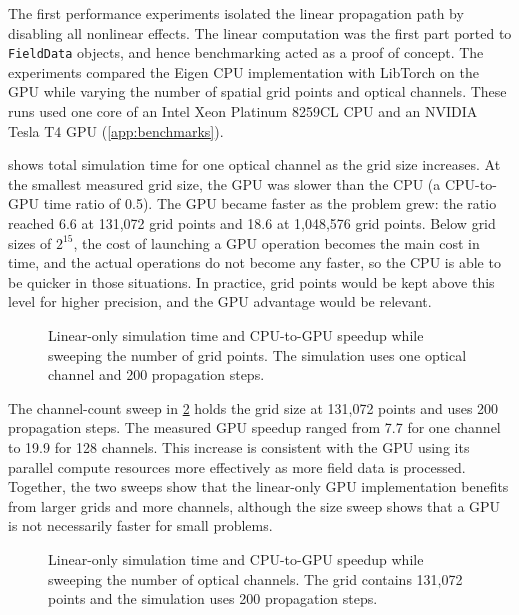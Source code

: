 The first performance experiments isolated the linear propagation path by disabling all
nonlinear effects. The linear computation was the first part ported to \texttt{FieldData}
objects, and hence benchmarking acted as a proof of concept. The experiments compared the
Eigen CPU implementation with LibTorch on the GPU while varying the number of spatial grid
points and optical channels. These runs used one core of an Intel Xeon Platinum 8259CL CPU and an
NVIDIA Tesla T4 GPU (\cref{app:benchmarks}).

 shows total simulation time for one optical channel as the grid
size increases. At the smallest measured grid size, the GPU was slower than the CPU (a
CPU-to-GPU time ratio of 0.5). The GPU became faster as the problem grew: the ratio reached
6.6 at 131,072 grid points and 18.6 at 1,048,576 grid points. Below grid sizes of $2^{15}$, 
the cost of launching a GPU operation becomes the main cost in time, and the actual operations 
do not become any faster, so the CPU is able to be quicker in those situations. In practice,
grid points would be kept above this level for higher precision, and the GPU advantage would 
be relevant.

\begin{figure}
  \centering
  \caption{Linear-only simulation time and CPU-to-GPU speedup while sweeping the number of
  grid points. The simulation uses one optical channel and 200 propagation steps.}
  \label{fig:linear-grid-sweep}
\end{figure}

The channel-count sweep in \cref{fig:linear-channel-sweep} holds the grid size at 131,072
points and uses 200 propagation steps. The measured GPU speedup ranged from 7.7 for one
channel to 19.9 for 128 channels. This increase is consistent with the GPU using its parallel
compute resources more effectively as more field data is processed. Together, the two sweeps
show that the linear-only GPU implementation benefits from larger grids and more channels,
although the size sweep shows that a GPU is not necessarily faster for small problems.

\begin{figure}
  \centering
  \caption{Linear-only simulation time and CPU-to-GPU speedup while sweeping the number of
  optical channels. The grid contains 131,072 points and the simulation uses 200 propagation
  steps.}
  \label{fig:linear-channel-sweep}
\end{figure}

